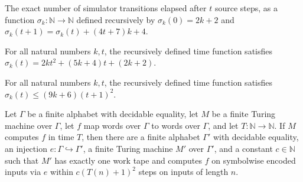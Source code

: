 \begin{definition}
\label{Turing.FinTM.sweepTime}
\leanok
The exact number of simulator transitions elapsed after $t$ source steps, as a function
$\sigma_k : \mathbb{N} \to \mathbb{N}$ defined recursively by $\sigma_k(0) = 2k+2$ and
$\sigma_k(t+1) = \sigma_k(t) + (4t+7)k + 4$.
\end{definition}

\begin{lemma}
\label{Turing.FinTM.sweepTime_eq}
\leanok
{}
For all natural numbers $k,t$, the recursively defined time function satisfies
$\sigma_k(t)=2kt^2+(5k+4)t+(2k+2)$.
\end{lemma}

\begin{lemma}
\label{Turing.FinTM.sweepTime_le}
\leanok
{}
For all natural numbers $k,t$, the recursively defined time function satisfies
$\sigma_k(t)\leq (9k+6)(t+1)^2$.
\end{lemma}

\begin{theorem}
\label{Turing.FinTM.one_work_tape}
\leanok
{}
Let $\Gamma$ be a finite alphabet with decidable equality, let $M$ be a finite Turing
machine over $\Gamma$, let $f$ map words over $\Gamma$ to words over $\Gamma$, and let
$T\colon\mathbb N\to\mathbb N$. If $M$ computes $f$ in time $T$, then there are a finite
alphabet $\Gamma'$ with decidable equality, an injection
$e\colon\Gamma\hookrightarrow\Gamma'$, a finite Turing machine $M'$ over $\Gamma'$, and
a constant $c\in\mathbb N$ such that $M'$ has exactly one work tape and computes $f$ on
symbolwise encoded inputs via $e$ within $c(T(n)+1)^2$ steps on inputs of length $n$.
\end{theorem}

